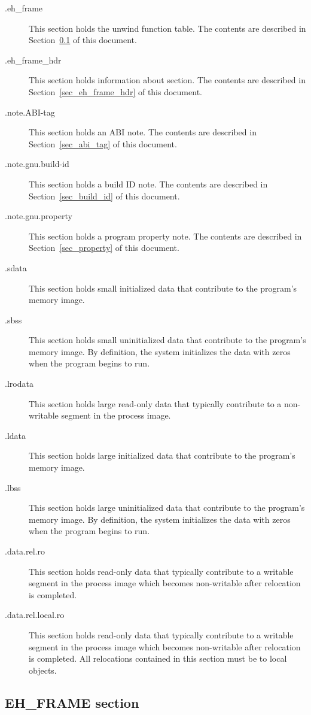 \begin{description}
 \item[.eh_frame] This section holds the unwind function table.  The
   contents are described in Section~\ref{sec_eh_frame} of this document.
 \item[.eh_frame_hdr] This section holds information about
    section. The contents are described in
   Section~\ref{sec_eh_frame_hdr} of this document.
 \item[.note.ABI-tag] This section holds an ABI  note.  The contents are
   described in Section~\ref{sec_abi_tag} of this document.
 \item[.note.gnu.build-id] This section holds a build ID note.  The
   contents are described in Section~\ref{sec_build_id} of this document.
 \item[.note.gnu.property] This section holds a program property note.
   The contents are described in Section~\ref{sec_property} of this
   document.
 \item[.sdata] This section holds small initialized data that
   contribute to the program's memory image.
 \item[.sbss] This section holds small uninitialized data that
   contribute to the program's memory image.  By definition, the system
   initializes the data with zeros when the program begins to run.
 \item[.lrodata] This section holds large read-only data that typically
   contribute to a non-writable segment in the process image.
 \item[.ldata] This section holds large initialized data that
   contribute to the program's memory image.
 \item[.lbss] This section holds large uninitialized data that
   contribute to the program's memory image.  By definition, the system
   initializes the data with zeros when the program begins to run.
 \item[.data.rel.ro] This section holds read-only data that typically
   contribute to a writable segment in the process image which becomes
   non-writable after relocation is completed.
 \item[.data.rel.local.ro] This section holds read-only data that
   typically contribute to a writable segment in the process image
   which becomes non-writable after relocation is completed.  All
   relocations contained in this section must be to local objects.
\end{description}

\subsection{EH\_FRAME section}
\label{sec_eh_frame}

